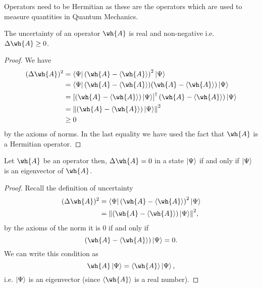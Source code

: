 \documentclass[12pt, a4paper]{article}
\begin{document}
\begin{mdnote}
    Operators need to be Hermitian as these are the operators which are used to measure quantities in Quantum Mechanics.
\end{mdnote}

\begin{theorem}
    The uncertainty of an operator \(\wh{A}\) is real and non-negative i.e. \(\Delta \wh{A} \geq 0\).
\end{theorem}

\begin{proof}
    We have 
    \[\begin{aligned}
        (\Delta \wh{A})^2 &= \bra{\Psi} \left( \wh{A}-\langle \wh{A}\rangle \right)^2 \ket{\Psi} \\
        &= \bra{\Psi} (\wh{A}-\langle \wh{A}\rangle) (\wh{A}-\langle \wh{A}\rangle) \ket{\Psi} \\
        &= \left[ (\wh{A}-\langle \wh{A}\rangle) \ket{\Psi} \right]^{\dagger} (\wh{A}-\langle \wh{A}\rangle) \ket{\Psi} \\
        &= \norm{ \left(\wh{A}-\langle \wh{A}\rangle \right) \ket{\Psi}}^2 \\
        &\geq 0
    \end{aligned}\]
    by the axioms of norms. In the last equality we have used the fact that \(\wh{A}\) is a Hermitian operator.
\end{proof}

\begin{corollary}
    Let \(\wh{A}\) be an operator then, \(\Delta \wh{A} =0\) in a state \(\ket{\Psi}\) if and only if \(\ket{\Psi}\) is an eigenvector of \(\wh{A}\).
\end{corollary}

\begin{proof}
    Recall the definition of uncertainty
    \[\begin{aligned}
        (\Delta \wh{A})^2 &= \bra{\Psi} \left( \wh{A}-\langle \wh{A}\rangle \right)^2 \ket{\Psi} \\
        &= \norm{ \left(\wh{A}-\langle \wh{A}\rangle \right) \ket{\Psi}}^2,
    \end{aligned}\]
    by the axioms of the norm it is \(0\) if and only if 
    \[\left( \wh{A}- \langle \wh{A} \rangle \right) \ket{\Psi} =0.\]
    We can write this condition as
    \[\wh{A} \ket{\Psi} = \langle \wh{A} \rangle \ket{\Psi},\]
    i.e. \(\ket{\Psi}\) is an eigenvector (since \(\langle \wh{A} \rangle\) is a real number).
\end{proof}
\end{document}
